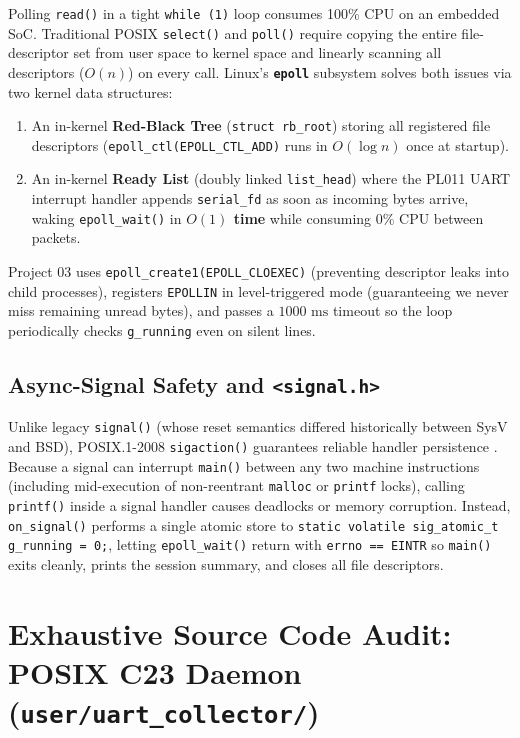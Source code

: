\documentclass[11pt,a4paper,oneside]{report}
\begin{document}
Polling \texttt{read()} in a tight \texttt{while (1)} loop consumes 100\% CPU on an embedded SoC. Traditional POSIX \texttt{select()} and \texttt{poll()} require copying the entire file-descriptor set from user space to kernel space and linearly scanning all descriptors ($O(n)$) on every call. Linux's \textbf{\texttt{epoll}} subsystem \cite{man_epoll,love2010} solves both issues via two kernel data structures:
\begin{enumerate}
\item An in-kernel \textbf{Red-Black Tree} (\texttt{struct rb\_root}) storing all registered file descriptors (\texttt{epoll\_ctl(EPOLL\_CTL\_ADD)} runs in $O(\log n)$ once at startup).
\item An in-kernel \textbf{Ready List} (doubly linked \texttt{list\_head}) where the PL011 UART interrupt handler appends \texttt{serial\_fd} as soon as incoming bytes arrive, waking \texttt{epoll\_wait()} in \textbf{$O(1)$ time} while consuming $0\%$ CPU between packets.
\end{enumerate}

Project 03 uses \texttt{epoll\_create1(EPOLL\_CLOEXEC)} (preventing descriptor leaks into child processes), registers \texttt{EPOLLIN} in level-triggered mode (guaranteeing we never miss remaining unread bytes), and passes a $1000\text{ ms}$ timeout so the loop periodically checks \texttt{g\_running} even on silent lines.

\section{Async-Signal Safety and \texttt{<signal.h>}}

Unlike legacy \texttt{signal()} (whose reset semantics differed historically between SysV and BSD), POSIX.1-2008 \texttt{sigaction()} guarantees reliable handler persistence \cite{man_sigaction}. Because a signal can interrupt \texttt{main()} between any two machine instructions (including mid-execution of non-reentrant \texttt{malloc} or \texttt{printf} locks), calling \texttt{printf()} inside a signal handler causes deadlocks or memory corruption. Instead, \texttt{on\_signal()} performs a single atomic store to \texttt{static volatile sig\_atomic\_t g\_running = 0;}, letting \texttt{epoll\_wait()} return with \texttt{errno == EINTR} so \texttt{main()} exits cleanly, prints the session summary, and closes all file descriptors.


\chapter{Exhaustive Source Code Audit: POSIX C23 Daemon (\texttt{user/uart\_collector/})}
\end{document}
